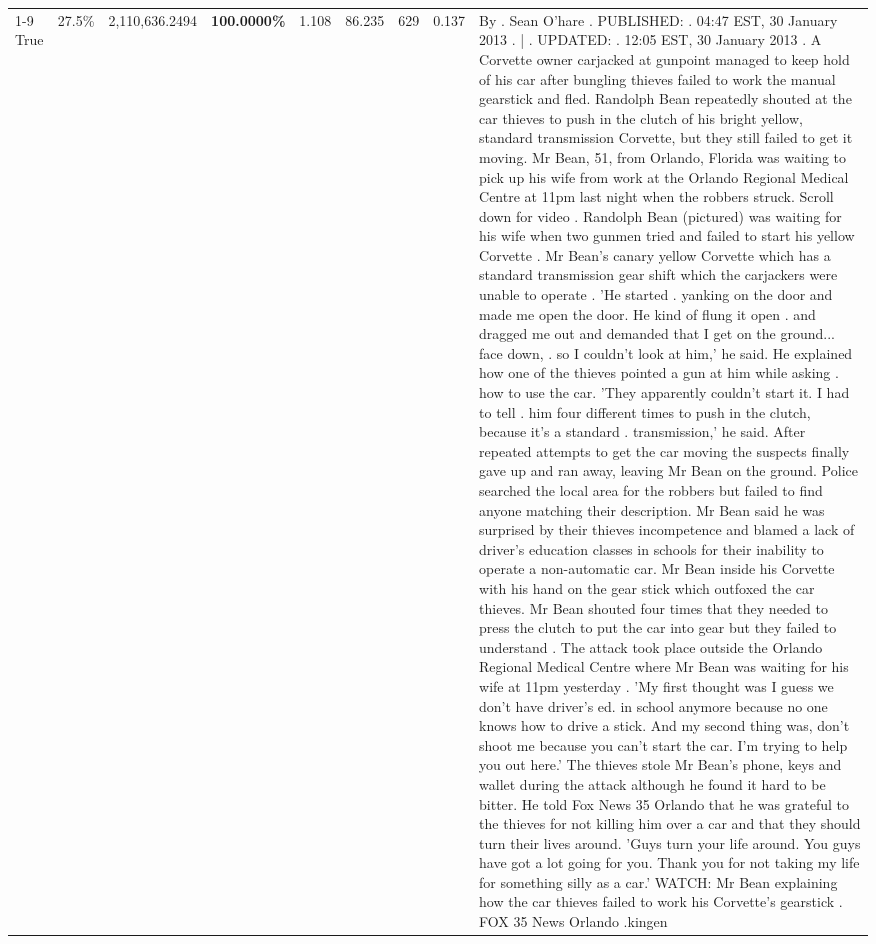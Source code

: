 \begin{table}[H]
\begin{tabular}{lllrlllll}
\cline{1-9} \cline{2-9}
True & 27.5\% & 2,110,636.2494 & \bfseries \color{red} 100.0000\% & 1.108 & 86.235 & 629 & 0.137 & By . Sean O'hare . PUBLISHED: . 04:47 EST, 30 January 2013 . | . UPDATED: . 12:05 EST, 30 January 2013 . A Corvette owner carjacked at gunpoint managed to keep hold of his car after bungling thieves failed to work the manual gearstick and fled. Randolph Bean repeatedly shouted at the car thieves to push in the clutch of his bright yellow, standard transmission Corvette, but they still failed to get it moving. Mr Bean, 51, from Orlando, Florida was waiting to pick up his wife from work at the Orlando Regional Medical Centre at 11pm last night when the robbers struck. Scroll down for video . Randolph Bean (pictured) was waiting for his wife when two gunmen tried and failed to start his yellow Corvette . Mr Bean's canary yellow Corvette which has a standard transmission gear shift which the carjackers were unable to operate . 'He started . yanking on the door and made me open the door. He kind of flung it open . and dragged me out and demanded that I get on the ground... face down, . so I couldn't look at him,' he said. He explained how one of the thieves pointed a gun at him while asking . how to use the car. 'They apparently couldn't start it. I had to tell . him four different times to push in the clutch, because it's a standard . transmission,' he said. After repeated attempts to get the car moving the suspects finally gave up and ran away, leaving Mr Bean on the ground. Police searched the local area for the robbers but failed to find anyone matching their description. Mr Bean said he was surprised by their thieves incompetence and blamed a lack of driver's education classes in schools for their inability to operate a non-automatic car. Mr Bean inside his Corvette with his hand on the gear stick which outfoxed the car thieves. Mr Bean shouted four times that they needed to press the clutch to put the car into gear but they failed to understand . The attack took place outside the Orlando Regional Medical Centre where Mr Bean was waiting for his wife at 11pm yesterday . 'My first thought was I guess we don't have driver's ed. in school anymore because no one knows how to drive a stick. And my second thing was, don't shoot me because you can't start the car. I'm trying to help you out here.' The thieves stole Mr Bean's phone, keys and wallet during the attack although he found it hard to be bitter. He told Fox News 35 Orlando that he was grateful to the thieves for not killing him over a car and that they should turn their lives around. 'Guys turn your life around. You guys have got a lot going for you. Thank you for not taking my life for something silly as a car.' WATCH: Mr Bean explaining how the car thieves failed to work his Corvette's gearstick . FOX 35 News Orlando .kingen \\

\end{tabular}
\end{table}
